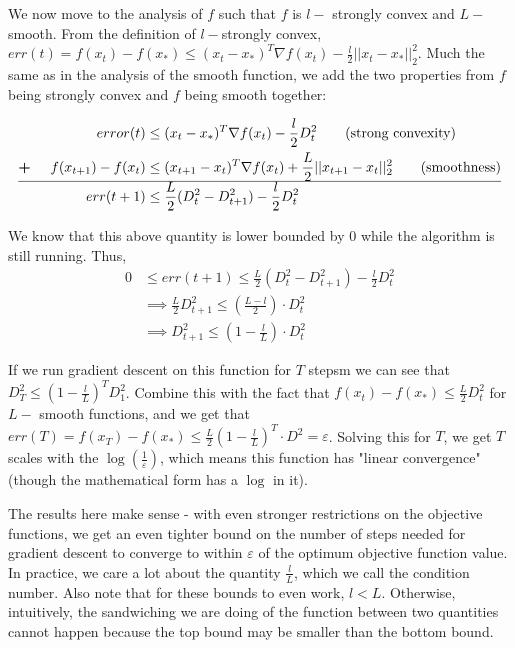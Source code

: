 \documentclass[11pt]{article}
\begin{document}
We now move to the analysis of $f$ such that $f$ is $l-$ strongly convex and $L-$smooth. From the definition of $l-$strongly convex, $err(t) = f(x_t) - f(x_*) \leq (x_t - x_*)^T \nabla f(x_t) - \frac{l}{2}||x_t - x_*||_2^2$.
Much the same as in the analysis of the smooth function, we add the two properties from $f$ being strongly convex and $f$ being smooth together:

\begin{align*}
    error(t) &\leq (x_t - x_*)^T \nabla f(x_t) - \frac{l}{2}D^2_t  \tag{strong convexity}\\
    \textbf{+} \hspace{5mm}f(x_{t+1}) - f(x_t) &\leq (x_{t+1} - x_t)^T \nabla f(x_t) + \frac{L}{2} ||x_{t+1} - x_t||_2^2 \tag{smoothness}\\
    \hline
    err(t+1) &\leq \frac{L}{2}(D_t^2 - D_{t+1}^2) - \frac{l}{2}D^2_t
\end{align*}

We know that this above quantity is lower bounded by $0$ while the algorithm is still running. Thus, 
\begin{align*}
    0 &\leq err(t+1) \leq \frac{L}{2}(D_t^2 - D_{t+1}^2) - \frac{l}{2}D^2_t \\
    &\implies \frac{L}{2} D^2_{t+1} \leq \left(\frac{L-l}{2}\right) \cdot D^2_t \\
    &\implies D^2_{t+1} \leq (1- \frac{l}{L}) \cdot D^2_t
\end{align*} 

If we run gradient descent on this function for $T$ stepsm we can see that $D^2_T \leq (1- \frac{l}{L})^TD_1^2$. Combine this with the fact that $f(x_t) - f(x_*) \leq \frac{L}{2} D_t^2$ for $L-$ smooth functions, and we get that $err(T) = f(x_T) - f(x_*) \leq \frac{L}{2}(1-\frac{l}{L})^T \cdot D^2 = \varepsilon$. Solving this for $T$, we get $T$ scales with the $\log(\frac{1}{\varepsilon})$, which means this function has "linear convergence" (though the mathematical form has a $\log$ in it). 

The results here make sense - with even stronger restrictions on the objective functions, we get an even tighter bound on the number of steps needed for gradient descent to converge to within $\varepsilon$ of the optimum objective function value.\\
In practice, we care a lot about the quantity $\frac{l}{L}$, which we call the condition number. Also note that for these bounds to even work, $l<L$. Otherwise, intuitively, the sandwiching we are doing of the function between two quantities cannot happen because the top bound may be smaller than the bottom bound.
\end{document}
